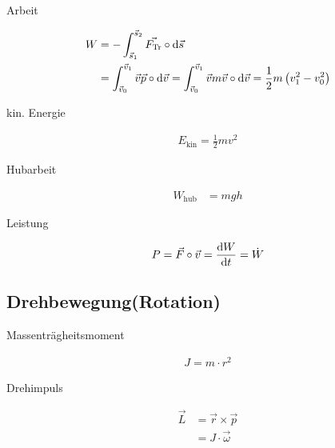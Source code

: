 \begin{boxleft}Arbeit
\end{boxleft}\begin{boxrightshaded}
\begin{align}
W&=-\int_{\vec{s}_1}^{\vec{s}_2}\vec{F_{\text{Tr}}}\circ\mathop{}\!\mathrm{d} \vec{s}\\
&=\int_{\vec{v}_0}^{\vec{v}_1}\vec{v}\vec{p}\circ\mathop{}\!\mathrm{d} \vec{v} =\int_{\vec{v}_0}^{\vec{v}_1}\vec{v}m\vec{v}\circ\mathop{}\!\mathrm{d} \vec{v}=\frac{1}{2}m\left(v_1^2-v_0^2\right) 
\end{align}
\end{boxrightshaded}

\begin{boxleft}kin. Energie
\end{boxleft}\begin{boxrightshaded}
\begin{align}
E_{\text{kin}}=\frac{1}{2}mv^2
\end{align}
\end{boxrightshaded}


\begin{boxleft}Hubarbeit
\end{boxleft}\begin{boxrightshaded}
\begin{align}
W_{\text{hub}}&=mgh
\end{align}
\end{boxrightshaded}

\begin{boxleft}Leistung
\end{boxleft}\begin{boxrightshaded}
\begin{align}
P=\vec{F}\circ\vec{v}=\frac{\mathop{}\!\mathrm{d} W}{\mathop{}\!\mathrm{d} t}=\dot{W}
\end{align}
\end{boxrightshaded}


\subsection{Drehbewegung(Rotation)}

\begin{boxleft}Massenträgheitsmoment
\end{boxleft}\begin{boxrightshaded}
\begin{align}
J=m\cdot r^2
\end{align}
\end{boxrightshaded}

\begin{boxleft}Drehimpuls
\end{boxleft}\begin{boxrightshaded}
\begin{align}
\vec{L}&=\vec{r}\times\vec{p} \\
&=J\cdot \vec{\omega}
\end{align}
\end{boxrightshaded}

